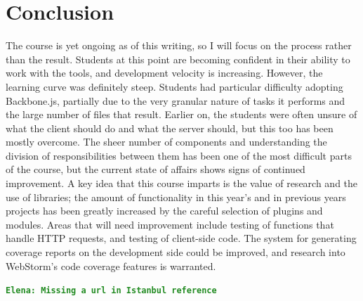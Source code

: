 \documentclass[12pt]{article}
\newcommand{\comment}[1]{{\bf \tt  {#1}}}
\newcommand{\emcomment}[1]{\textcolor{ForestGreen}{\comment{Elena: {#1}}}}
\begin{document}
\section{Conclusion}\label{sec:conclusion}
The course is yet ongoing as of this writing, so I will focus on the process rather than the result. Students at this point are becoming confident in their ability to work with the tools, and development velocity is increasing. However, the learning curve was definitely steep. Students had particular difficulty adopting Backbone.js, partially due to the very granular nature of tasks it performs and the large number of files that result. Earlier on, the students were often unsure of what the client should do and what the server should, but this too has been mostly overcome. The sheer number of components and understanding the division of responsibilities between them has been one of the most  difficult parts of the course, but the current state of affairs shows signs of continued improvement. A key idea that this course imparts is the value of research and the use of libraries; the amount of functionality in this year's and in previous years projects has been greatly increased by the careful selection of plugins and modules. Areas that will need improvement include testing of functions that handle HTTP requests, and testing of client-side code. The system for generating coverage reports on the development side could be improved, and research into WebStorm's code coverage features is warranted.

\emcomment{Missing a url in Istanbul reference}

%
%




%  
%
%


\end{document}
